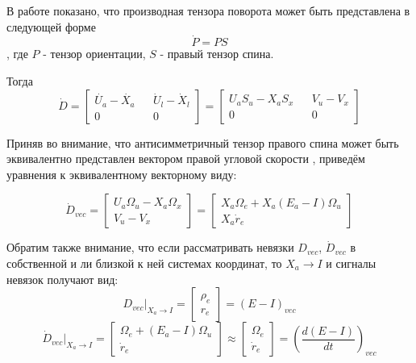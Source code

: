 \documentclass[a4paper]{article}
\begin{document}
В работе \cite{zhilin} показано, что производная тензора поворота может быть представлена в следующей форме
\begin{equation} \dot{P} = P S \end{equation}
, где $P$ - тензор ориентации, $S$ - правый тензор спина.

Тогда 
\begin{equation} 
\dot{D} = \begin{bmatrix}\dot{U_a} - \dot{X_a}&&\dot{U}_l-\dot{X}_l\\0&&0\end{bmatrix} 
= \begin{bmatrix}U_aS_u - X_aS_x&&V_u-V_x\\0&&0\end{bmatrix}\end{equation}

Приняв во внимание, что антисимметричный тензор правого спина может быть эквивалентно представлен вектором правой угловой скорости \cite{zhilin}, приведём уравнения к эквивалентному векторному виду:

\begin{equation}\dot{D}_{vec} = \begin{bmatrix}U_a\Omega_u-X_a\Omega_x\\ V_u-V_x\end{bmatrix}=\begin{bmatrix}X_a\Omega_e + X_a(E_a-I)\Omega_u\\ X_a\dot{r}_e\end{bmatrix}\end{equation}

Обратим также внимание, что если рассматривать невязки $D_{vec}$, $\dot{D}_{vec}$ в собственной и ли близкой к ней системах координат, то $X_a\rightarrow I$ и сигналы невязок получают вид:
\begin{equation} \label{simpl1} D_{vec}|_{X_a\rightarrow I} = \begin{bmatrix}\rho_e\\r_e\end{bmatrix} = (E-I)_{vec} \end{equation}
\begin{equation} \label{simpl2}\dot{D}_{vec}|_{X_a\rightarrow I} = \begin{bmatrix}\Omega_e + (E_a-I)\Omega_u\\ \dot{r}_e\end{bmatrix}\approx\begin{bmatrix}\Omega_e\\ \dot{r}_e\end{bmatrix} = \left(\frac{d(E-I)}{dt}\right)_{vec}
\end{equation}
\end{document}
